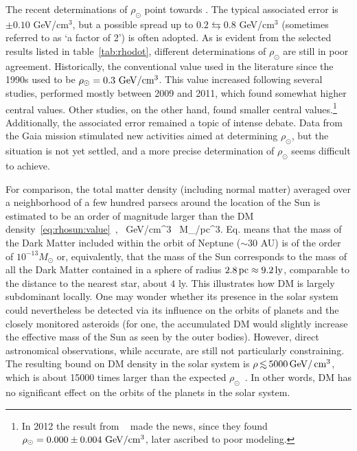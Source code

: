 \begin{itemize}
The recent determinations of $\rho_\odot$ point towards 
\beq
\label{eq:rhosun:value}
.
\eeq
The typical associated error  is $\pm 0.10$ GeV/cm$^{3}$, 
but a possible spread up to $0.2 \leftrightarrows 0.8$ GeV/cm$^{3}$ (sometimes referred to as `a factor of 2') is often adopted. As is evident from the selected results listed in table~\ref{tab:rhodot}, different determinations of $\rho_\odot$ are still in poor agreement. Historically, the conventional value used in the literature since the 1990s used to be $\rho_\odot = 0.3 \, \,{\rm GeV}/{\rm cm}^{3}$. This value increased following several studies, performed mostly between 2009 and 2011, which found somewhat higher central values. 
Other studies, on the other hand,  found smaller central values.\footnote{In 2012 the result from ~\cite{rhoSun} made the news, since they found $\rho_\odot = 0.000\pm0.004 \ {\rm GeV}/{\rm cm}^3$, later ascribed to poor modeling.} 
Additionally, the associated error remained a topic of intense debate.
Data from the {\sc Gaia} mission stimulated new activities aimed at determining $\rho_\odot$, but the situation is not yet  settled, and a more precise determination of $\rho_\odot$ seems difficult to achieve.
\end{itemize}
For comparison, the total matter density (including normal matter) averaged over a neighborhood of a few hundred parsecs around the location of the Sun is estimated to be an order of magnitude larger than the DM density~\eqref{eq:rhosun:value}~\cite{1711.07504}, 
 \, {\rm GeV}/{\rm cm}^{3}  \, M_\odot/{\rm pc}^{3}.\eeq
Eq. means that the mass of the Dark Matter included within the orbit of Neptune ($\sim 30$ AU) is of the order of $10^{-13} M_\odot$ or, equivalently, that the mass of the Sun corresponds to the mass of all the Dark Matter contained in a sphere of radius $2.8\,{\rm pc} \approx 9.2 \,{\rm ly}$, comparable to the distance to the nearest star, about $4$ ly. 
This illustrates how DM is largely subdominant locally. One may wonder whether its presence in the solar system could nevertheless be detected via its influence on the orbits of planets and the closely monitored asteroids (for one, the accumulated DM would slightly increase the effective mass of the Sun as seen by the outer bodies). However, direct astronomical observations, while accurate, are still not particularly constraining. The resulting bound on DM density in the solar system is $\rho \circa{<} 5000\GeV/\cm^3$, which is about 15000 times larger than the expected $\rho_\odot$~\cite{DMsolarsystem}. In other words, DM has no significant effect on the orbits of the planets in the solar system. 

